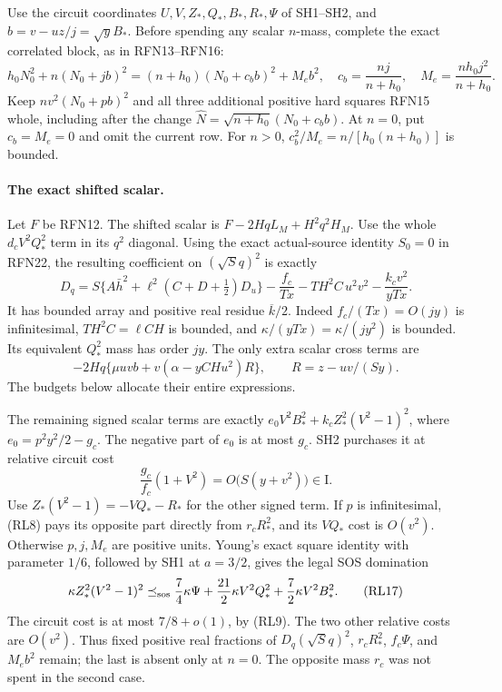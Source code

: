 Use the circuit coordinates \(U,V,Z_*,Q_*,B_*,R_*,\Psi\)
of SH1--SH2, and \(b=v-uz/j=\sqrt y B_*\).
Before spending any scalar \(n\)-mass, complete the exact correlated
block, as in RFN13--RFN16:
\[
 h_0N_0^2+n(N_0+jb)^2
 =(n+h_0)(N_0+c_bb)^2+M_e b^2,\quad
 c_b=\frac{nj}{n+h_0},\quad M_e=\frac{nh_0j^2}{n+h_0}.  \tag{RL13}
\]
Keep \(nv^2(N_0+pb)^2\) and all three additional positive hard
squares RFN15 whole, including after the change
\(\widehat N=\sqrt{n+h_0}(N_0+c_bb)\).
At \(n=0\), put \(c_b=M_e=0\) and omit the current row.
For \(n>0\), \(c_b^2/M_e=n/[h_0(n+h_0)]\) is bounded.

\paragraph{The exact shifted scalar.}
Let \(F\) be RFN12.  The shifted scalar is
\(F-2HqL_M+H^2q^2H_M\).
Use the whole \(d_cV^2Q_*^2\) term in its \(q^2\) diagonal.
Using the exact actual-source identity \(S_0=0\) in RFN22,
the resulting coefficient on \((\sqrt S q)^2\) is exactly
\[
 D_q=S\{A\bar h^2+\ell^2(C+D+\tfrac12)D_u\}
       -\frac{f_c}{Tx}-TH^2C\,u^2v^2
       -\frac{k_cv^2}{yTx}.                            \tag{RL14}
\]
It has bounded array and positive real residue \(\overline k/2\).
Indeed \(f_c/(Tx)=O(jy)\) is infinitesimal, \(TH^2C=\ell CH\)
is bounded, and \(\kappa/(yTx)=\kappa/(jy^2)\) is bounded.
Its equivalent \(Q_*^2\) mass has order \(jy\).
The only extra scalar cross terms are
\[
 -2Hq\{\mu uvb+v(\alpha-yCHu^2)R\},\qquad
 R=z-uv/(Sy).                                        \tag{RL15}
\]
The budgets below allocate their entire expressions.

The remaining signed scalar terms are exactly
\(e_0V^2B_*^2+k_cZ_*^2(V^2-1)^2\), where
\(e_0=p^2y^2/2-g_c\).
The negative part of \(e_0\) is at most \(g_c\).
SH2 purchases it at relative circuit cost
\[
 \frac{g_c}{f_c}(1+V^2)
   =O\bigl(S(y+v^2)\bigr)\in\mathrm I.                \tag{RL16}
\]
Use \(Z_*(V^2-1)=-VQ_*-R_*\) for the other signed term.
If \(p\) is infinitesimal, (RL8) pays its opposite part
directly from \(r_cR_*^2\), and its \(VQ_*\) cost is
\(O(v^2)\).
Otherwise \(p,j,M_e\) are positive units.  Young's exact
square identity with parameter \(1/6\), followed by SH1 at
\(a=3/2\), gives the legal SOS domination
\[
 \kappa Z_*^2(V^2-1)^2
 \preceq_{\rm sos}
 \frac74\kappa\Psi+
 \frac{21}{2}\kappa V^2Q_*^2+
 \frac72\kappa V^2B_*^2 .                             \tag{RL17}
\]
The circuit cost is at most \(7/8+o(1)\), by (RL9).
The two other relative costs are \(O(v^2)\).
Thus fixed positive real fractions of \(D_q(\sqrt S q)^2\),
\(r_cR_*^2\), \(f_c\Psi\), and \(M_eb^2\) remain;
the last is absent only at \(n=0\).
The opposite mass \(r_c\) was not spent in the second case.

